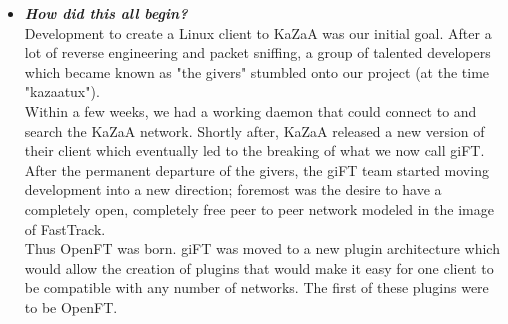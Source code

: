 \documentclass[10pt]{article}
\newcommand{\question}[1]{\item\textbf{\emph{#1}}}
\begin{document}
\begin{itemize}
\question {How did this all begin?}\\
Development to create a Linux client to KaZaA was our initial
goal. After a lot of reverse engineering and packet sniffing, a
group of talented developers which became known as "the givers"
stumbled onto our project (at the time "kazaatux"). \\
Within a few weeks, we had a working daemon that could connect to
and search the KaZaA network. Shortly after, KaZaA released a new
version of their client which eventually led to the breaking of
what we now call giFT. \\
After the permanent departure of the givers, the giFT team started
moving development into a new direction; foremost was the desire
to have a completely open, completely free peer to peer network
modeled in the image of FastTrack. \\
Thus OpenFT was born. giFT was moved to a new plugin architecture
which would allow the creation of plugins that would make it easy
for one client to be compatible with any number of networks. The
first of these plugins were to be OpenFT.

\end{itemize}
\end{document}
